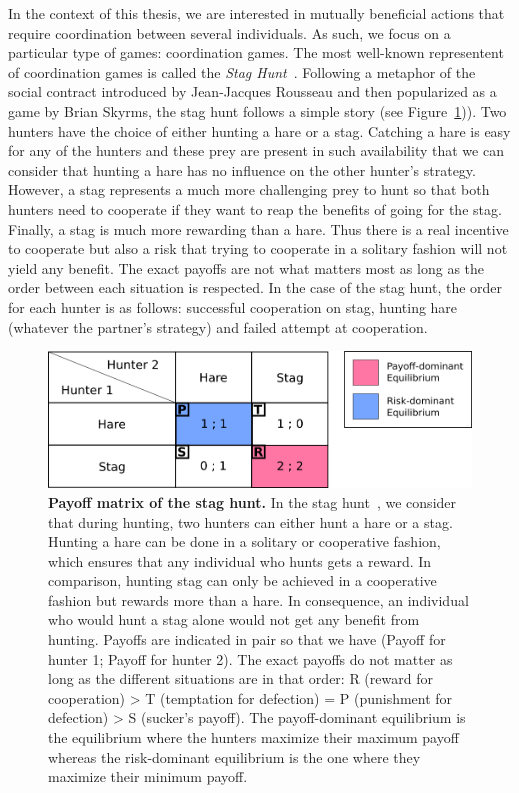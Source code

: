     In the context of this thesis, we are interested in mutually beneficial actions that require coordination between several individuals. As such, we focus on a particular type of games: coordination games. The most well-known representent of coordination games is called the \emph{Stag Hunt}~\parencite{Skyrms2004}. Following a metaphor of the social contract introduced by Jean-Jacques Rousseau and then popularized as a game by Brian Skyrms, the stag hunt follows a simple story (see Figure~\ref{fig:MatrixStagHunt})). Two hunters have the choice of either hunting a hare or a stag. Catching a hare is easy for any of the hunters and these prey are present in such availability that we can consider that hunting a hare has no influence on the other hunter's strategy. However, a stag represents a much more challenging prey to hunt so that both hunters need to cooperate if they want to reap the benefits of going for the stag. Finally, a stag is much more rewarding than a hare. Thus there is a real incentive to cooperate but also a risk that trying to cooperate in a solitary fashion will not yield any benefit. The exact payoffs are not what matters most as long as the order between each situation is respected. In the case of the stag hunt, the order for each hunter is as follows: successful cooperation on stag, hunting hare (whatever the partner's strategy) and failed attempt at cooperation.

    \begin{figure}[hbt]
        \begin{center}
          \includegraphics[scale = 0.50]{fig/Intro/StagHunt.png}
          \caption{\textbf{Payoff matrix of the stag hunt.} 
          In the stag hunt~\parencite{Skyrms2004}, we consider that during hunting, two hunters can either hunt a hare or a stag. Hunting a hare can be done in a solitary or cooperative fashion, which ensures that any individual who hunts gets a reward. In comparison, hunting stag can only be achieved in a cooperative fashion but rewards more than a hare. In consequence, an individual who would hunt a stag alone would not get any benefit from hunting. Payoffs are indicated in pair so that we have (Payoff for hunter 1; Payoff for hunter 2). The exact payoffs do not matter as long as the different situations are in that order: R (reward for cooperation) > T (temptation for defection) = P (punishment for defection) > S (sucker's payoff). The payoff-dominant equilibrium is the equilibrium where the hunters maximize their maximum payoff whereas the risk-dominant equilibrium is the one where they maximize their minimum payoff.} 
          \label{fig:MatrixStagHunt}
        \end{center}
    \end{figure}


